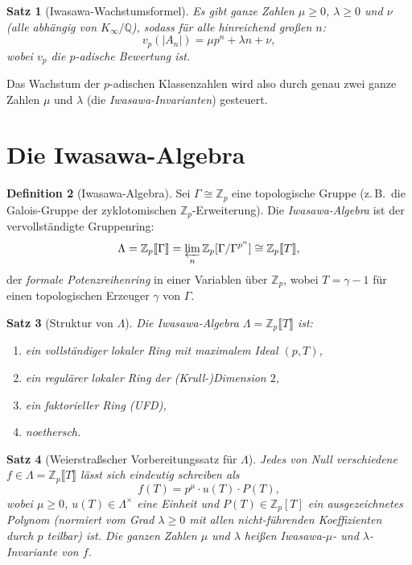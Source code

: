 \documentclass[12pt,a4paper]{amsart}
\newtheorem{theorem}{Satz}[section]
\theoremstyle{definition}
\newtheorem{definition}[theorem]{Definition}
\newcommand{\Q}{\mathbb{Q}}
\newcommand{\Zp}{\mathbb{Z}_p}
\begin{document}
\begin{theorem}[Iwasawa-Wachstumsformel]
\label{thm:wachstum}
Es gibt ganze Zahlen $\mu \ge 0$, $\lambda \ge 0$ und $\nu$ (alle abhängig
von $K_\infty/\Q$), sodass für alle hinreichend großen $n$:
\[
  v_p(|A_n|) = \mu p^n + \lambda n + \nu,
\]
wobei $v_p$ die $p$-adische Bewertung ist.
\end{theorem}

Das Wachstum der $p$-adischen Klassenzahlen wird also durch genau zwei
ganze Zahlen $\mu$ und $\lambda$ (die \emph{Iwasawa-Invarianten}) gesteuert.

\section{Die Iwasawa-Algebra}

\begin{definition}[Iwasawa-Algebra]
\label{def:iwasawa_algebra}
Sei $\Gamma \cong \Zp$ eine topologische Gruppe (z.\,B.\ die Galois-Gruppe
der zyklotomischen $\Zp$-Erweiterung).  Die \emph{Iwasawa-Algebra} ist der
vervollständigte Gruppenring:
\[
  \Lambda = \Zp\llbracket\Gamma\rrbracket
  = \varprojlim_n \Zp[\Gamma/\Gamma^{p^n}]
  \cong \Zp\llbracket T \rrbracket,
\]
der \emph{formale Potenzreihenring} in einer Variablen über $\Zp$, wobei
$T = \gamma - 1$ für einen topologischen Erzeuger $\gamma$ von $\Gamma$.
\end{definition}

\begin{theorem}[Struktur von $\Lambda$]
\label{thm:lambda_struktur}
Die Iwasawa-Algebra $\Lambda = \Zp\llbracket T \rrbracket$ ist:
\begin{enumerate}[label=(\roman*)]
  \item ein \emph{vollständiger lokaler Ring} mit maximalem Ideal $(p, T)$,
  \item ein \emph{regulärer lokaler Ring} der (Krull-)Dimension $2$,
  \item ein \emph{faktorieller Ring} (UFD),
  \item \emph{noethersch}.
\end{enumerate}
\end{theorem}

\begin{theorem}[Weierstraßscher Vorbereitungssatz für $\Lambda$]
\label{thm:weierstrass}
Jedes von Null verschiedene $f \in \Lambda = \Zp\llbracket T \rrbracket$
lässt sich eindeutig schreiben als
\[
  f(T) = p^\mu \cdot u(T) \cdot P(T),
\]
wobei $\mu \ge 0$, $u(T) \in \Lambda^\times$ eine Einheit und
$P(T) \in \Zp[T]$ ein \emph{ausgezeichnetes Polynom} (normiert vom Grad
$\lambda \ge 0$ mit allen nicht-führenden Koeffizienten durch $p$ teilbar)
ist.  Die ganzen Zahlen $\mu$ und $\lambda$ heißen
\emph{Iwasawa-$\mu$- und $\lambda$-Invariante} von $f$.
\end{theorem}
\end{document}
